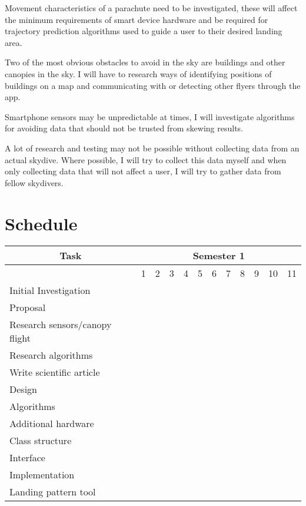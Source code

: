 \documentclass{article}
\begin{document}
Movement characteristics of a parachute need to be investigated, these will affect the minimum requirements of smart device hardware and be required for trajectory prediction algorithms used to guide a user to their desired landing area.

Two of the most obvious obstacles to avoid in the sky are buildings and other canopies in the sky. I will have to research ways of identifying positions of buildings on a map and communicating with or detecting other flyers through the app.

Smartphone sensors may be unpredictable at times, I will investigate algorithms for avoiding data that should not be trusted from skewing results.

A lot of research and testing may not be possible without collecting data from an actual skydive. Where possible, I will try to collect this data myself and when only collecting data that will not affect a user, I will try to gather data from fellow skydivers.

\section{Schedule}

\begin{tabular}{@{}llllllllllll@{}}
\toprule
\multicolumn{1}{c}{Task} & \multicolumn{11}{c}{Semester 1} \\ \midrule
 & 1 & 2 & 3 & 4 & 5 & 6 & 7 & 8 & 9 & 10 & 11 \\ \midrule
Initial Investigation & \cellcolor[HTML]{34FF34} & \cellcolor[HTML]{34FF34} &  &  &  &  &  &  &  &  &  \\ \midrule
Proposal &  &  & \cellcolor[HTML]{34FF34}{\color[HTML]{000000} } &  &  &  &  &  &  &  &  \\ \midrule
Research sensors/canopy flight &  &  &  & \cellcolor[HTML]{34FF34} &  &  &  &  &  &  &  \\ \midrule
Research algorithms &  &  &  & \cellcolor[HTML]{34FF34} & \cellcolor[HTML]{34FF34} &  &  &  &  &  &  \\ \midrule
Write scientific article &  &  &  &  & \cellcolor[HTML]{34FF34} & \cellcolor[HTML]{34FF34} & \cellcolor[HTML]{34FF34} &  &  &  &  \\ \midrule
Design & \multicolumn{11}{l}{} \\ \midrule
\indent Algorithms &  &  &  &  & \cellcolor[HTML]{34FF34} &  &  &  &  &  &  \\ \midrule
\indent Additional hardware &  &  &  &  & \cellcolor[HTML]{34FF34} &  &  &  &  &  &  \\ \midrule
\indent Class structure &  &  &  &  &  & \cellcolor[HTML]{34FF34} &  &  &  &  &  \\ \midrule
\indent Interface &  &  &  &  &  & \cellcolor[HTML]{34FF34} &  &  &  &  &  \\ \midrule
Implementation & \multicolumn{11}{l}{} \\ \midrule
\indent Landing pattern tool &  &  &  &  &  &  &  & \cellcolor[HTML]{34FF34} & \cellcolor[HTML]{34FF34} & \cellcolor[HTML]{34FF34} & \cellcolor[HTML]{34FF34} \\ \bottomrule
\end{tabular}
\end{document}
